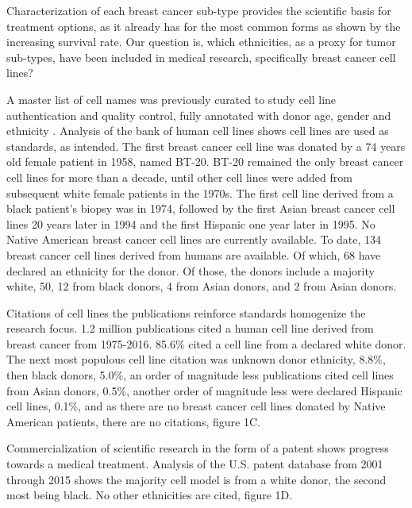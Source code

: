 \documentclass[10pt]{article}
\begin{document}
\begin{multicols}{2}
Characterization of each breast cancer sub-type provides the scientific basis for treatment options, as it already has for the most common forms as shown by the increasing survival rate. Our question is, which ethnicities, as a proxy for tumor sub-types, have been included in medical research, specifically breast cancer cell lines? 

A master list of cell names was previously curated to study cell line authentication and quality control, fully annotated with donor age, gender and ethnicity \cite{yu2015resource}. Analysis of the bank of human cell lines shows cell lines are used as standards, as intended. The first breast cancer cell line was donated by a 74 years old female patient in 1958, named BT-20. BT-20 remained the only breast cancer cell lines for more than a decade, until other cell lines were added from subsequent white female patients in the 1970s. The first cell line derived from a black patient's biopsy was in 1974, followed by the first Asian breast cancer cell lines 20 years later in 1994 and the first Hispanic one year later in 1995. No Native American breast cancer cell lines are currently available. To date, 134 breast cancer cell lines derived from humans are available. Of which, 68 have declared an ethnicity for the donor. Of those, the donors include a majority white, 50, 12 from black donors, 4 from Asian donors, and 2 from Asian donors.

Citations of cell lines the publications reinforce standards homogenize the research focus. 1.2 million publications cited a human cell line derived from breast cancer from 1975-2016. 85.6\% cited a cell line from a declared white donor. The next most populous cell line citation was unknown donor ethnicity, 8.8\%, then black donors, 5.0\%, an order of magnitude less publications cited cell lines from Asian donors, 0.5\%, another order of magnitude less were declared Hispanic cell lines, 0.1\%, and as there are no breast cancer cell lines donated by Native American patients, there are no citations, figure 1C.

Commercialization of scientific research in the form of a patent shows progress towards a medical treatment. Analysis of the U.S. patent database from 2001 through 2015 shows the majority cell model is from a white donor, the second most being black. No other ethnicities are cited, figure 1D. 


\end{multicols}
\end{document}
